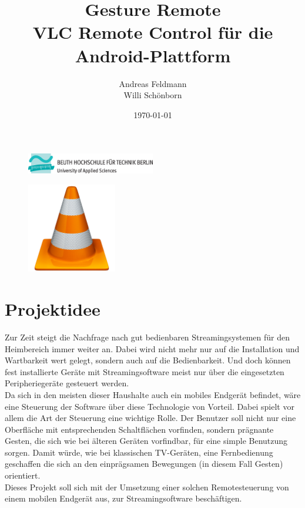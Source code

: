 \documentclass[a4paper,12pt]{article}
\title{Gesture Remote \\ VLC Remote Control für die Android-Plattform}
\author{Andreas Feldmann \\ Willi Schönborn}
\date{\today}
\begin{document}
\begin{figure}[H]
\centering
\includegraphics[width=0.5\textwidth]{beuth.eps}
\maketitle
\end{figure}

\begin{figure}[H]
\centering
\includegraphics[width=0.35\textwidth]{vlc.png}
\end{figure}

\newpage
\tableofcontents

\newpage
\section{Projektidee}
Zur Zeit steigt die Nachfrage nach gut bedienbaren Streamingsystemen für den Heimbereich immer weiter an. Dabei wird nicht mehr nur auf die Installation und Wartbarkeit wert gelegt, sondern auch auf die Bedienbarkeit. Und doch können fest installierte Geräte mit Streamingsoftware meist nur über die eingesetzten Peripheriegeräte gesteuert werden. \\
Da sich in den meisten dieser Haushalte auch ein mobiles Endgerät befindet, wäre eine Steuerung der Software über diese Technologie von Vorteil. Dabei spielt vor allem die Art der Steuerung eine wichtige Rolle. Der Benutzer soll nicht nur eine Oberfläche mit entsprechenden Schaltflächen vorfinden, sondern prägnante Gesten, die sich wie bei älteren Geräten vorfindbar, für eine simple Benutzung sorgen. Damit würde, wie bei klassischen TV-Geräten, eine Fernbedienung geschaffen die sich an den einprägsamen Bewegungen (in diesem Fall Gesten) orientiert. \\
Dieses Projekt soll sich mit der Umsetzung einer solchen Remotesteuerung von einem mobilen Endgerät aus, zur Streamingsoftware beschäftigen.
\end{document}
